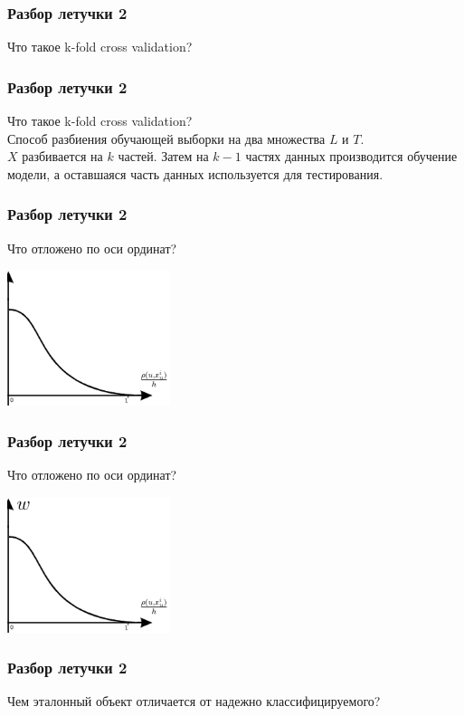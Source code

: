 \documentclass[12pt]{beamer}
\begin{document}
\begin{frame}\frametitle{Разбор летучки 2}
Что такое k-fold cross validation? 
\end{frame}

\begin{frame}\frametitle{Разбор летучки 2}
Что такое k-fold cross validation? \\
\vspace{5mm}
Способ разбиения обучающей выборки на два множества $L$ и $T$.\\
$X$ разбивается на $k$ частей. Затем на ${k-1}$ частях данных производится обучение модели, а оставшаяся часть данных используется для тестирования.
\end{frame}

\begin{frame}\frametitle{Разбор летучки 2}
      Что отложено по оси ординат? \\
   \begin{minipage}[t]{0.35\linewidth}

	\includegraphics[height=150px]{images/parzen}
   \end{minipage}
\end{frame}

\begin{frame}\frametitle{Разбор летучки 2}
      Что отложено по оси ординат? \\
   \begin{minipage}[t]{0.35\linewidth}

	\includegraphics[height=150px]{images/parzen1}
   \end{minipage}
\end{frame}

\begin{frame}\frametitle{Разбор летучки 2}
Чем эталонный объект отличается от надежно классифицируемого?\\
\end{frame}
\end{document}
